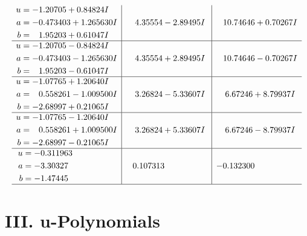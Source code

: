 \documentclass[1p]{elsarticle_modified}
\theoremstyle{definition}
\begin{document}
$$\begin{array}{c|c|c}
\begin{aligned}
u &= -1.20705 + 0.84824 I \\
a &= -0.473403 + 1.265630 I \\
b &= \phantom{-}1.95203 + 0.61047 I\end{aligned}
 & \phantom{-}4.35554 - 2.89495 I & \phantom{-}10.74646 + 0.70267 I \\ \hline\begin{aligned}
u &= -1.20705 - 0.84824 I \\
a &= -0.473403 - 1.265630 I \\
b &= \phantom{-}1.95203 - 0.61047 I\end{aligned}
 & \phantom{-}4.35554 + 2.89495 I & \phantom{-}10.74646 - 0.70267 I \\ \hline\begin{aligned}
u &= -1.07765 + 1.20640 I \\
a &= \phantom{-}0.558261 - 1.009500 I \\
b &= -2.68997 + 0.21065 I\end{aligned}
 & \phantom{-}3.26824 - 5.33607 I & \phantom{-}6.67246 + 8.79937 I \\ \hline\begin{aligned}
u &= -1.07765 - 1.20640 I \\
a &= \phantom{-}0.558261 + 1.009500 I \\
b &= -2.68997 - 0.21065 I\end{aligned}
 & \phantom{-}3.26824 + 5.33607 I & \phantom{-}6.67246 - 8.79937 I \\ \hline\begin{aligned}
u &= -0.311963\phantom{ +0.000000I} \\
a &= -3.30327\phantom{ +0.000000I} \\
b &= -1.47445\phantom{ +0.000000I}\end{aligned}
 & \phantom{-}0.107313\phantom{ +0.000000I} & -0.132300\phantom{ +0.000000I}\\
 \hline 
 \end{array}$$\newpage
\newpage\renewcommand{\arraystretch}{1}
\centering \section*{ III. u-Polynomials}
\end{document}
